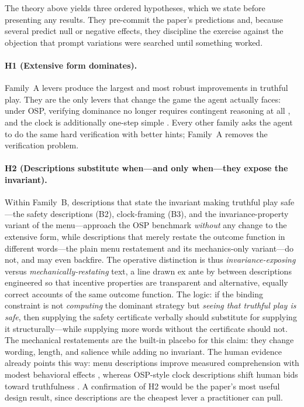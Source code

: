 The theory above yields three ordered hypotheses, which we state before
presenting any results. They pre-commit the paper's predictions and, because
several predict null or negative effects, they discipline the exercise against
the objection that prompt variations were searched until something worked.

\paragraph{H1 (Extensive form dominates).}
Family~A levers produce the largest and most robust improvements in truthful
play. They are the only levers that change the game the agent actually faces:
under OSP, verifying dominance no longer requires contingent reasoning at all
\citep{li2017obviously}, and the clock is additionally one-step simple
\citep{pycia2023theory}. Every other family asks the agent to do the same hard
verification with better hints; Family~A removes the verification problem.

\paragraph{H2 (Descriptions substitute when---and only when---they expose the
invariant).}
Within Family~B, descriptions that state the invariant making truthful play
safe---the safety descriptions (B2), clock-framing (B3), and the
invariance-property variant of the menu---approach the OSP benchmark
\emph{without} any change to the extensive form, while descriptions that
merely restate the outcome function in different words---the plain menu
restatement and its mechanics-only variant---do not, and may even backfire.
The operative distinction is thus \emph{invariance-exposing} versus
\emph{mechanically-restating} text, a line drawn ex ante by
\citet{gonczarowski2023strategyproofness} between descriptions engineered so
that incentive properties are transparent and alternative, equally correct
accounts of the same outcome function. The logic: if the binding constraint is
not \emph{computing} the dominant strategy but \emph{seeing that truthful play
is safe}, then supplying the safety certificate verbally should substitute for
supplying it structurally---while supplying more words without the certificate
should not. The mechanical restatements are the built-in placebo for this
claim: they change wording, length, and salience while adding no invariant.
The human evidence already points this way: menu descriptions improve measured
comprehension with modest behavioral effects \citep{gonczarowski2024describing},
whereas OSP-style clock descriptions shift human bids toward truthfulness
\citep{breitmoser2022obviousness}. A confirmation of H2 would be the paper's
most useful design result, since descriptions are the cheapest lever a
practitioner can pull.

